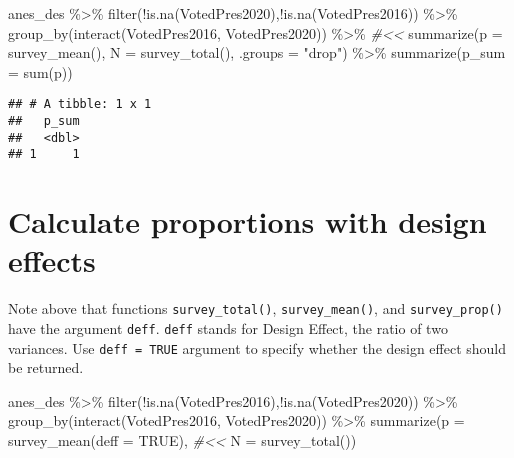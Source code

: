 \documentclass[
]{krantz}
\makeatletter
\newenvironment{Shaded}{\begin{snugshade}}{\end{snugshade}}
\newcommand{\AttributeTok}[1]{\textcolor[rgb]{0.61,0.61,0.61}{#1}}
\newcommand{\CommentTok}[1]{\textcolor[rgb]{0.37,0.37,0.37}{\textit{#1}}}
\newcommand{\ConstantTok}[1]{\textcolor[rgb]{0,0,0}{#1}}
\newcommand{\FunctionTok}[1]{\textcolor[rgb]{0,0,0}{#1}}
\newcommand{\NormalTok}[1]{#1}
\newcommand{\SpecialCharTok}[1]{\textcolor[rgb]{0,0,0}{#1}}
\newcommand{\StringTok}[1]{\textcolor[rgb]{0.5,0.5,0.5}{#1}}
\newenvironment{kframe}{%
\medskip{}
\setlength{\fboxsep}{.8em}
 \def\at@end@of@kframe{}%
 \ifinner\ifhmode%
  \def\at@end@of@kframe{\end{minipage}}%
  \begin{minipage}{\columnwidth}%
 \fi\fi%
 \def\FrameCommand##1{\hskip\@totalleftmargin \hskip-\fboxsep
 \colorbox{shadecolor}{##1}\hskip-\fboxsep
     \hskip-\linewidth \hskip-\@totalleftmargin \hskip\columnwidth}%
 \MakeFramed {\advance\hsize-\width
   \@totalleftmargin\z@ \linewidth\hsize
   \@setminipage}}%
 {\par\unskip\endMakeFramed%
 \at@end@of@kframe}
\renewenvironment{Shaded}{\begin{kframe}}{\end{kframe}}
\makeatother
\begin{document}
\begin{Shaded}
\begin{Highlighting}[]
\NormalTok{anes\_des }\SpecialCharTok{\%\textgreater{}\%}
  \FunctionTok{filter}\NormalTok{(}\SpecialCharTok{!}\FunctionTok{is.na}\NormalTok{(VotedPres2020),}\SpecialCharTok{!}\FunctionTok{is.na}\NormalTok{(VotedPres2016)) }\SpecialCharTok{\%\textgreater{}\%}
  \FunctionTok{group\_by}\NormalTok{(}\FunctionTok{interact}\NormalTok{(VotedPres2016, VotedPres2020)) }\SpecialCharTok{\%\textgreater{}\%} \CommentTok{\#\textless{}\textless{}}
  \FunctionTok{summarize}\NormalTok{(}\AttributeTok{p =} \FunctionTok{survey\_mean}\NormalTok{(),}
            \AttributeTok{N =} \FunctionTok{survey\_total}\NormalTok{(),}
            \AttributeTok{.groups =} \StringTok{"drop"}\NormalTok{) }\SpecialCharTok{\%\textgreater{}\%} 
  \FunctionTok{summarize}\NormalTok{(}\AttributeTok{p\_sum =} \FunctionTok{sum}\NormalTok{(p))}
\end{Highlighting}
\end{Shaded}

\begin{verbatim}
## # A tibble: 1 x 1
##   p_sum
##   <dbl>
## 1     1
\end{verbatim}

\hypertarget{calculate-proportions-with-design-effects}{%
\section{Calculate proportions with design effects}\label{calculate-proportions-with-design-effects}}

Note above that functions \texttt{survey\_total()}, \texttt{survey\_mean()}, and \texttt{survey\_prop()} have the argument \texttt{deff}. \texttt{deff} stands for Design Effect, the ratio of two variances. Use \texttt{deff\ =\ TRUE} argument to specify whether the design effect should be returned.

\begin{Shaded}
\begin{Highlighting}[]
\NormalTok{anes\_des }\SpecialCharTok{\%\textgreater{}\%}
  \FunctionTok{filter}\NormalTok{(}\SpecialCharTok{!}\FunctionTok{is.na}\NormalTok{(VotedPres2016),}\SpecialCharTok{!}\FunctionTok{is.na}\NormalTok{(VotedPres2020)) }\SpecialCharTok{\%\textgreater{}\%}
  \FunctionTok{group\_by}\NormalTok{(}\FunctionTok{interact}\NormalTok{(VotedPres2016, VotedPres2020)) }\SpecialCharTok{\%\textgreater{}\%}
  \FunctionTok{summarize}\NormalTok{(}\AttributeTok{p =} \FunctionTok{survey\_mean}\NormalTok{(}\AttributeTok{deff =} \ConstantTok{TRUE}\NormalTok{), }\CommentTok{\#\textless{}\textless{}}
            \AttributeTok{N =} \FunctionTok{survey\_total}\NormalTok{())}
\end{Highlighting}
\end{Shaded}
\end{document}
